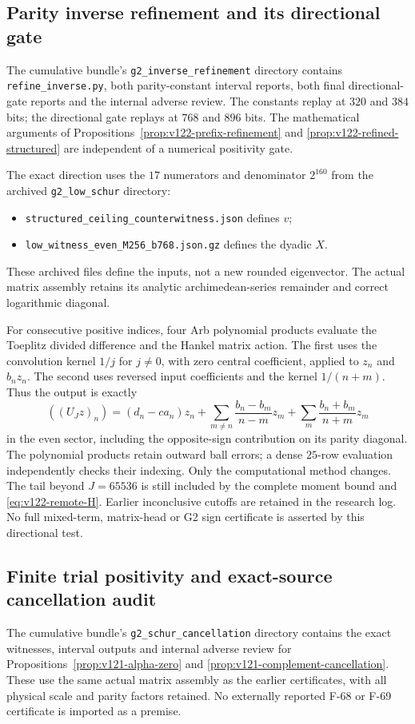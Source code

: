 \documentclass[11pt]{article}
\theoremstyle{remark}
\begin{document}
\subsection*{Parity inverse refinement and its directional gate}
\label{app:v122-inverse}
The cumulative bundle's \texttt{g2\_inverse\_refinement} directory
contains \texttt{refine\_inverse.py}, both parity-constant interval
reports, both final directional-gate reports and the internal adverse
review. The constants replay at $320$ and $384$ bits; the directional
gate replays at $768$ and $896$ bits. The mathematical arguments of
Propositions~\ref{prop:v122-prefix-refinement} and
\ref{prop:v122-refined-structured} are independent of a numerical
positivity gate.

The exact direction uses the $17$ numerators and denominator $2^{160}$
from the archived \texttt{g2\_low\_schur} directory:
\begin{itemize}[nosep]
\item \nolinkurl{structured_ceiling_counterwitness.json} defines $v$;
\item \nolinkurl{low_witness_even_M256_b768.json.gz} defines the dyadic $X$.
\end{itemize}
These archived files define the inputs, not a new rounded eigenvector.
The actual matrix assembly retains its analytic archimedean-series
remainder and correct logarithmic diagonal.

For consecutive positive indices, four Arb polynomial products
evaluate the Toeplitz divided difference and the Hankel matrix action.
The first uses the convolution kernel $1/j$ for $j\ne0$, with zero
central coefficient, applied to $z_n$ and $b_nz_n$. The second
uses reversed input coefficients and the kernel $1/(n+m)$.
Thus the output is exactly
\[
 ((U_Jz)_n)=(d_n-ca_n)z_n+
 \sum_{m\ne n}\frac{b_n-b_m}{n-m}z_m+
 \sum_m\frac{b_n+b_m}{n+m}z_m
\]
in the even sector, including the opposite-sign contribution on its
parity diagonal. The polynomial products retain outward ball errors;
a dense $25$-row evaluation independently checks their indexing.
Only the computational method changes. The tail beyond $J=65536$
is still included by the complete moment bound and
\eqref{eq:v122-remote-H}. Earlier inconclusive cutoffs are retained
in the research log. No full mixed-term, matrix-head or G2 sign
certificate is asserted by this directional test.

\subsection*{Finite trial positivity and exact-source cancellation audit}
\label{app:v121-audit}
The cumulative bundle's \texttt{g2\_schur\_cancellation} directory
contains the exact witnesses, interval outputs and internal adverse
review for Propositions~\ref{prop:v121-alpha-zero} and
\ref{prop:v121-complement-cancellation}. These use the same actual
matrix assembly as the earlier certificates, with all physical scale
and parity factors retained. No externally reported F-68 or F-69
certificate is imported as a premise.
\end{document}

